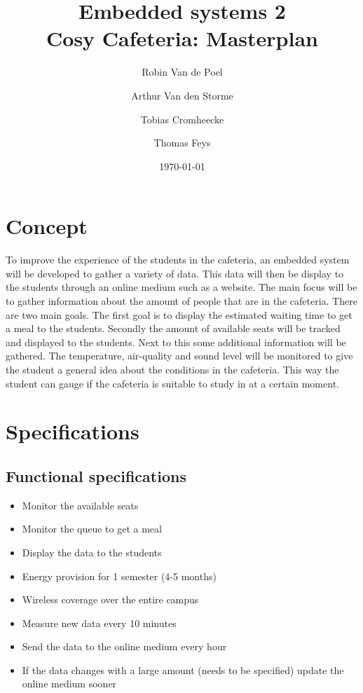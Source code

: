 \documentclass[11pt,a4paper]{article}
\begin{document}
	\title{Embedded systems 2\\
		\Huge Cosy Cafeteria: Masterplan
	}
	\author{Robin Van de Poel\and Arthur Van den Storme\and Tobias Cromheecke\and Thomas Feys}
	\date{\today}
	\maketitle
	\newpage
	
	\tableofcontents
	\newpage

	
	\section{Concept}
	To improve the experience of the students in the cafeteria, an embedded system will be developed to gather a variety of data. This data will then be display to the students through an online medium such as a website. The main focus will be to gather information about the amount of people that are in the cafeteria. There are two main goals. The first goal is to display the estimated waiting time to get a meal to the students. Secondly the amount of available seats will be tracked and displayed to the students. Next to this some additional information will be gathered. The temperature, air-quality and sound level will be monitored to give the student a general idea about the conditions in the cafeteria. This way the student can gauge if the cafeteria is suitable to study in at a certain moment.

	\section{Specifications}
	\subsection{Functional specifications}
	\begin{itemize}
		\item Monitor the available seats
		\item Monitor the queue to get a meal
		\item Display the data to the students
		\item Energy provision for 1 semester (4-5 months)
		\item Wireless coverage over the entire campus
		\item Measure new data every 10 minutes
		\item Send the data to the online medium every hour 
		\item If the data changes with a large amount (needs to be specified) update the online medium sooner
	\end{itemize}
\end{document}

